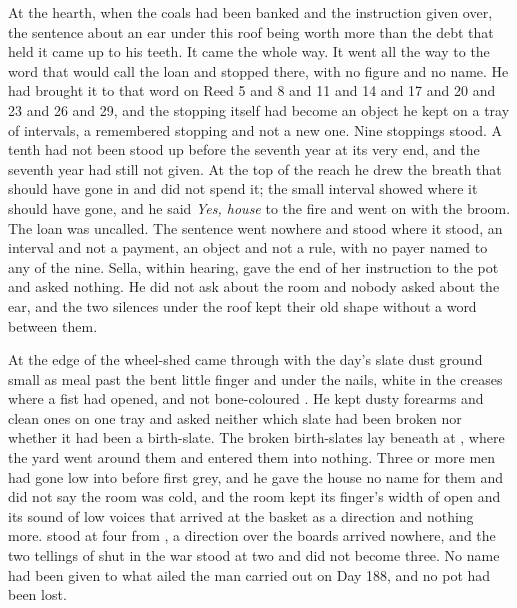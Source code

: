 At the hearth, when the coals had been banked and the instruction given over, the sentence about an ear under this roof being worth more than the debt that held it came up to his teeth. It came the whole way. It went all the way to the word that would call the loan and stopped there, with no figure and no name. He had brought it to that word on Reed 5 and 8 and 11 and 14 and 17 and 20 and 23 and 26 and 29, and the stopping itself had become an object he kept on a tray of intervals, a remembered stopping and not a new one. Nine stoppings stood. A tenth had not been stood up before the seventh year at its very end, and the seventh year had still not given. At the top of the reach he drew the breath that should have gone in and did not spend it; the small interval showed where it should have gone, and he said \emph{Yes, house} to the fire and went on with the broom. The loan was uncalled. The sentence went nowhere and stood where it stood, an interval and not a payment, an object and not a rule, with no payer named to any of the nine. Sella, within hearing, gave the end of her instruction to the pot and asked nothing. He did not ask about the room and nobody asked about the ear, and the two silences under the roof kept their old shape without a word between them.

\scenebreak

At the edge of the wheel-shed  came through with the day's slate dust ground small as meal past the bent little finger and under the nails, white in the creases where a fist had opened, and not bone-coloured . He kept dusty forearms and clean ones on one tray and asked neither which slate had been broken nor whether it had been a birth-slate. The broken birth-slates lay beneath  at , where the yard went around them and entered them into nothing. Three or more men had gone low into  before first grey, and he gave the house no name for them and did not say the room was cold, and the room kept its finger's width of open and its sound of low voices that arrived at the basket as a direction and nothing more.  stood at four from , a direction over the boards arrived nowhere, and the two tellings of  shut in the war stood at two and did not become three. No name had been given to what ailed the man carried out on Day 188, and no pot had been lost.

